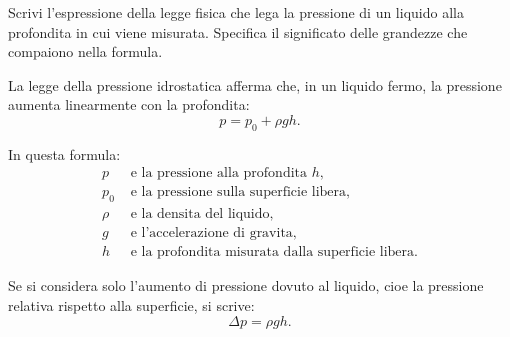 
\begin{esercizio}
Scrivi l'espressione della legge fisica che lega la pressione di un liquido
alla profondita in cui viene misurata. Specifica il significato delle grandezze
che compaiono nella formula.
\end{esercizio}

\begin{soluzione}
La legge della pressione idrostatica afferma che, in un liquido fermo, la
pressione aumenta linearmente con la profondita:
\[
p=p_0+\rho gh.
\]

In questa formula:
\[
\begin{aligned}
p &\text{ e la pressione alla profondita } h,\\
p_0 &\text{ e la pressione sulla superficie libera,}\\
\rho &\text{ e la densita del liquido,}\\
g &\text{ e l'accelerazione di gravita,}\\
h &\text{ e la profondita misurata dalla superficie libera.}
\end{aligned}
\]

Se si considera solo l'aumento di pressione dovuto al liquido, cioe la
pressione relativa rispetto alla superficie, si scrive:
\[
\Delta p=\rho gh.
\]
\end{soluzione}
